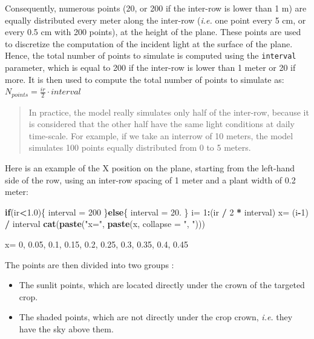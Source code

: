 \documentclass[]{book}
\newenvironment{Shaded}{\begin{snugshade}}{\end{snugshade}}
\newcommand{\KeywordTok}[1]{\textcolor[rgb]{0.13,0.29,0.53}{\textbf{#1}}}
\newcommand{\DataTypeTok}[1]{\textcolor[rgb]{0.13,0.29,0.53}{#1}}
\newcommand{\DecValTok}[1]{\textcolor[rgb]{0.00,0.00,0.81}{#1}}
\newcommand{\FloatTok}[1]{\textcolor[rgb]{0.00,0.00,0.81}{#1}}
\newcommand{\StringTok}[1]{\textcolor[rgb]{0.31,0.60,0.02}{#1}}
\newcommand{\ControlFlowTok}[1]{\textcolor[rgb]{0.13,0.29,0.53}{\textbf{#1}}}
\newcommand{\OperatorTok}[1]{\textcolor[rgb]{0.81,0.36,0.00}{\textbf{#1}}}
\newcommand{\NormalTok}[1]{#1}
\providecommand{\tightlist}{%
  \setlength{\itemsep}{0pt}\setlength{\parskip}{0pt}}
\theoremstyle{definition}
\theoremstyle{definition}
\theoremstyle{definition}
\theoremstyle{remark}
\begin{document}
Consequently, numerous points (20, or 200 if the inter-row is lower than
1 m) are equally distributed every meter along the inter-row
(\emph{i.e.} one point every 5 cm, or every 0.5 cm with 200 points), at
the height of the plane. These points are used to discretize the
computation of the incident light at the surface of the plane.\\
Hence, the total number of points to simulate is computed using the
\texttt{interval} parameter, which is equal to 200 if the inter-row is
lower than 1 meter or 20 if more. It is then used to compute the total
number of points to simulate as:
\(N_{points}=\frac{ir}{2}\cdot interval\)

\begin{quote}
In practice, the model really simulates only half of the inter-row,
because it is considered that the other half have the same light
conditions at daily time-scale. For example, if we take an interrow of
10 meters, the model simulates 100 points equally distributed from 0 to
5 meters.
\end{quote}

Here is an example of the X position on the plane, starting from the
left-hand side of the row, using an inter-row spacing of 1 meter and a
plant width of 0.2 meter:

\begin{Shaded}
\begin{Highlighting}[]
\ControlFlowTok{if}\NormalTok{(ir}\OperatorTok{<}\FloatTok{1.0}\NormalTok{)\{}
\NormalTok{  interval =}\StringTok{ }\DecValTok{200}
\NormalTok{\}}\ControlFlowTok{else}\NormalTok{\{}
\NormalTok{  interval =}\StringTok{ }\DecValTok{20}\NormalTok{.}
\NormalTok{\}}
\NormalTok{i=}\StringTok{ }\DecValTok{1}\OperatorTok{:}\NormalTok{(ir }\OperatorTok{/}\StringTok{ }\DecValTok{2} \OperatorTok{*}\StringTok{ }\NormalTok{interval)}
\NormalTok{x=}\StringTok{ }\NormalTok{(i}\OperatorTok{-}\DecValTok{1}\NormalTok{) }\OperatorTok{/}\StringTok{ }\NormalTok{interval}
\KeywordTok{cat}\NormalTok{(}\KeywordTok{paste}\NormalTok{(}\StringTok{"x="}\NormalTok{, }\KeywordTok{paste}\NormalTok{(x, }\DataTypeTok{collapse =} \StringTok{", "}\NormalTok{)))}
\end{Highlighting}
\end{Shaded}

x= 0, 0.05, 0.1, 0.15, 0.2, 0.25, 0.3, 0.35, 0.4, 0.45

The points are then divided into two groups :

\begin{itemize}
\tightlist
\item
  The sunlit points, which are located directly under the crown of the
  targeted crop.
\item
  The shaded points, which are not directly under the crop crown,
  \emph{i.e.} they have the sky above them.
\end{itemize}
\end{document}
